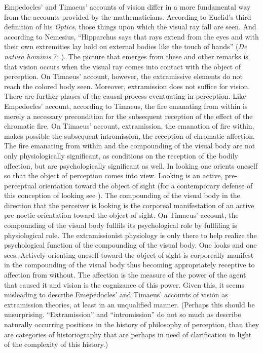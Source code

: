 Empedocles' and Timaeus' accounts of vision differ in a more fundamental way from the accounts provided by the mathematicians. According to Euclid's third definition of his \emph{Optics}, those things upon which the visual ray fall are seen. And according to Nemesius, ``Hipparchus says that rays extend from the eyes and with their own extremities lay hold on external bodies like the touch of hands'' (\emph{De natura hominis} 7; \citealt[104]{Sharples:2008aa}). The picture that emerges from these and other remarks is that vision occurs when the visual ray comes into contact with the object of perception. On Timaeus' account, however, the extramissive elements do not reach the colored body seen. Moreover, extramission does not suffice for vision. There are further phases of the causal process eventuating in perception. Like Empedocles' account, according to Timaeus, the fire emanating from within is merely a necessary precondition for the subsequent reception of the effect of the chromatic fire. On Timaeus' account, extramission, the emanation of fire within, makes possible the subsequent intromission, the reception of chromatic affection. The fire emanating from within and the compounding of the visual body are not only physiologically significant, as conditions on the reception of the bodily affection, but are psychologically significant as well. In looking one orients oneself so that the object of perception comes into view. Looking is an active, pre-perceptual orientation toward the object of sight (for a contemporary defense of this conception of looking see \citealt[chapter 5]{Kalderon:2018oe}). The compounding of the visual body in the direction that the perceiver is looking is the corporeal manifestation of an active pre-noetic orientation toward the object of sight. On Timaeus' account, the compounding of the visual body fullfils its psychological role by fullfiling is physiological role. The extramissionist physiology is only there to help realize the psychological function of the compounding of the visual body. One looks and one sees. Actively orienting oneself toward the object of sight is corporeally manifest in the compounding of the visual body thus becoming appropriately receptive to affection from without. The affection is the measure of the power of the agent that caused it and vision is the cognizance of this power. Given this, it seems misleading to describe Emepedocles' and Timaeus' accounts of vision as extramission theories, at least in an unqualified manner. (Perhaps this should be unsurprising. ``Extramission'' and ``intromission'' do not so much as describe naturally occurring positions in the history of philosophy of perception, than they are categories of historiography that are perhaps in need of clarification in light of the complexity of this history.)

